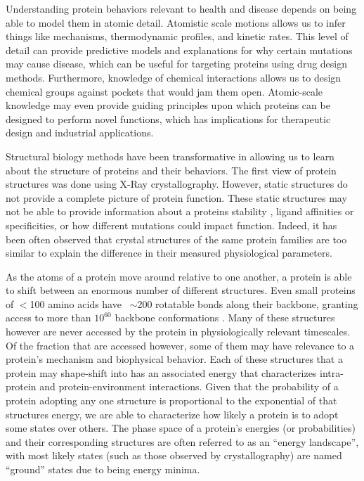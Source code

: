 \documentclass[../main.tex]{subfiles}
\begin{document}
	Understanding protein behaviors relevant to health and disease depends on being able to model them in atomic detail. Atomistic scale motions allows us to infer things like mechanisms, thermodynamic profiles, and kinetic rates. This level of detail can provide predictive models and explanations for why certain mutations may cause disease, which can be useful for targeting proteins using drug design methods. Furthermore, knowledge of chemical interactions allows us to design chemical groups against pockets that would jam them open\cite{Roth:2017gk}. Atomic-scale knowledge may even provide guiding principles upon which proteins can be designed to perform novel functions, which has implications for therapeutic design and industrial applications\cite{weitzner_computational_2019}.

	Structural biology methods have been transformative in allowing us to learn about the structure of proteins and their behaviors. The first view of protein structures was done using X-Ray crystallography\cite{kendrew_three-dimensional_1958}. However, static structures do not provide a complete picture of protein function. These static structures may not be able to provide information about a proteins stability \cite{khan_performance_2010}, ligand affinities or specificities\cite{yin_overview_2017}, or how different mutations could impact function\cite{Hart:2016kb}. Indeed, it has been often observed that crystal structures of the same protein families are too similar to explain the difference in their measured physiological parameters\cite{porter_conformational_2020}.

	As the atoms of a protein move around relative to one another, a protein is able to shift between an enormous number of different structures. Even small proteins of $<$100 amino acids have ~$\sim$200 rotatable bonds along their backbone, granting access to more than $10^{60}$ backbone conformations \cite{levinthal_how_1969}. Many of these structures however are never accessed by the protein in physiologically relevant timescales.  Of the fraction that are accessed however, some of them may have relevance to a protein’s mechanism and biophysical behavior. Each of these structures that a protein may shape-shift into has an associated energy that characterizes intra-protein and protein-environment interactions. Given that the probability of a protein adopting any one structure is proportional to the exponential of that structures energy, we are able to characterize how likely a protein is to adopt some states over others. The phase space of a protein’s energies (or probabilities) and their corresponding structures are often referred to as an “energy landscape”, with most likely states (such as those observed by crystallography) are named “ground” states due to being energy minima. 
\end{document}
